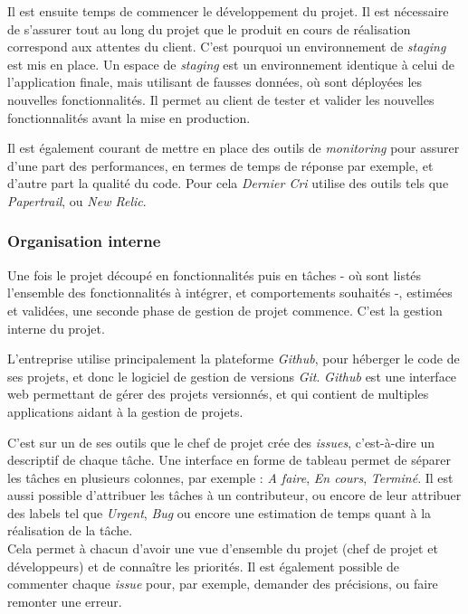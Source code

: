 \documentclass[12pt,a4paper]{article}
\begin{document}
  Il est ensuite temps de commencer le développement du projet. Il est
  nécessaire de s'assurer tout au long du projet que le produit en cours
  de réalisation correspond aux attentes du client. C'est pourquoi un
  environnement de \emph{staging} est mis en place. Un espace de
  \emph{staging} est un environnement identique à celui de l'application
  finale, mais utilisant de fausses données, où sont déployées les
  nouvelles fonctionnalités. Il permet au client de tester et valider les
  nouvelles fonctionnalités avant la mise en production.

  \bigskip

  Il est également courant de mettre en place des outils de
  \emph{monitoring} pour assurer d'une part des performances, en termes de
  temps de réponse par exemple, et d'autre part la qualité du code. Pour
  cela \emph{Dernier Cri} utilise des outils tels que \emph{Papertrail},
  ou \emph{New Relic}.

  \bigskip

  \subsubsection{Organisation interne}\label{organisation-interne}

  \bigskip

  Une fois le projet découpé en fonctionnalités puis en tâches - où sont
  listés l'ensemble des fonctionnalités à intégrer, et comportements
  souhaités -, estimées et validées, une seconde phase de gestion de
  projet commence. C'est la gestion interne du projet.

  L'entreprise utilise principalement la plateforme \emph{Github}, pour
  héberger le code de ses projets, et donc le logiciel de gestion de
  versions \emph{Git}. \emph{Github} est une interface web permettant de
  gérer des projets versionnés, et qui contient de multiples applications
  aidant à la gestion de projets.

  \bigskip

  C'est sur un de ses outils que le chef de projet crée des \emph{issues},
  c'est-à-dire un descriptif de chaque tâche. Une interface en forme de
  tableau permet de séparer les tâches en plusieurs colonnes, par exemple
  : \emph{A faire}, \emph{En cours}, \emph{Terminé}. Il est aussi possible
  d'attribuer les tâches à un contributeur, ou encore de leur attribuer
  des labels tel que \emph{Urgent}, \emph{Bug} ou encore une estimation de
  temps quant à la réalisation de la tâche.\\
  Cela permet à chacun d'avoir une vue d'ensemble du projet (chef de
  projet et développeurs) et de connaître les priorités. Il est également
  possible de commenter chaque \emph{issue} pour, par exemple, demander
  des précisions, ou faire remonter une erreur.
\end{document}
